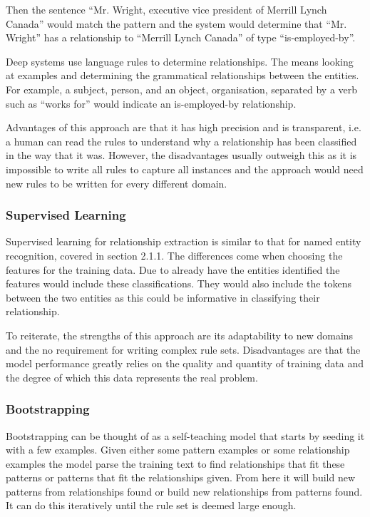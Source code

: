 \noindent Then the sentence “Mr. Wright, executive vice president of Merrill Lynch Canada” would match the pattern and the system would determine that “Mr. Wright” has a relationship to “Merrill Lynch Canada” of type “is-employed-by”.

Deep systems use language rules to determine relationships. The means looking at examples and determining the grammatical relationships between the entities. For example, a subject, person, and an object, organisation, separated by a verb such as “works for” would indicate an is-employed-by relationship.

Advantages of this approach are that it has high precision and is transparent, i.e. a human can read the rules to understand why a relationship has been classified in the way that it was. However, the disadvantages usually outweigh this as it is impossible to write all rules to capture all instances and the approach would need new rules to be written for every different domain.

\subsubsection{Supervised Learning}

Supervised learning for relationship extraction is similar to that for named entity recognition, covered in section 2.1.1. The differences come when choosing the features for the training data. Due to already have the entities identified the features would include these classifications. They would also include the tokens between the two entities as this could be informative in classifying their relationship.

To reiterate, the strengths of this approach are its adaptability to new domains and the no requirement for writing complex rule sets. Disadvantages are that the model performance greatly relies on the quality and quantity of training data and the degree of which this data represents the real problem.

\subsubsection{Bootstrapping}
Bootstrapping can be thought of as a self-teaching model that starts by seeding it with a few examples. Given either some pattern examples or some relationship examples the model parse the training text to find relationships that fit these patterns or patterns that fit the relationships given. From here it will build new patterns from relationships found or build new relationships from patterns found. It can do this iteratively  until the rule set is deemed large enough.

